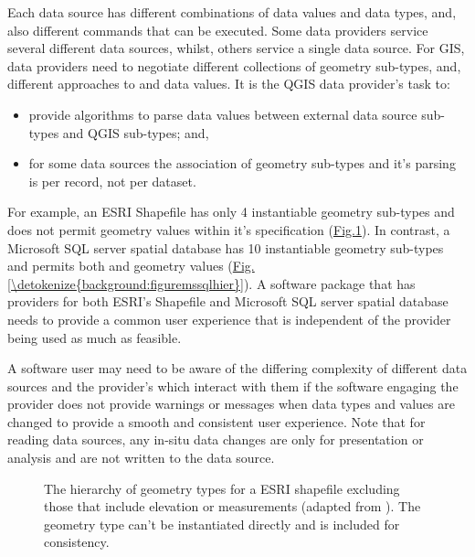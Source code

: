 \documentclass[a4paper,11pt,english]{sphinxmanual}
\begin{document}
Each data source has different combinations of data values and data types, and, also different commands that can be executed.  Some data providers service several different data sources, whilst, others service a single data source. For GIS, data providers need to negotiate different collections of geometry sub-types, and, different approaches to  and  data values.  It is the QGIS data provider’s task to:
\begin{itemize}
\item {} 
provide algorithms to parse data values between external data source sub-types and QGIS sub-types; and,

\item {} 
for some data sources the association of geometry sub-types and it’s parsing is per record, not per dataset.

\end{itemize}

For example, an ESRI Shapefile has only 4 instantiable geometry sub-types and does not permit  geometry values within it’s specification (\hyperref[\detokenize{background:figureshapehier}]{Fig.\@ \ref{\detokenize{background:figureshapehier}}}).  In contrast, a Microsoft SQL server spatial database has 10 instantiable geometry sub-types and permits both  and  geometry values (\hyperref[\detokenize{background:figuremssqlhier}]{Fig.\@ \ref{\detokenize{background:figuremssqlhier}}}).  A software package that has providers for both ESRI’s Shapefile and Microsoft SQL server spatial database needs to provide a common user experience that is independent of the provider being used as much as feasible.

A software user may need to be aware of the differing complexity of different data sources and the provider’s which interact with them if the software engaging the provider does not provide warnings or messages when data types and values are changed  to provide a smooth and consistent user experience.  Note that for reading data sources, any in-situ data changes are only for presentation or analysis and are not written to the data source.

\begin{figure}[htbp]
\centering
\capstart

\noindent{}
\caption{The hierarchy of geometry types for a ESRI shapefile excluding those that include elevation or measurements (adapted from ).  The  geometry type can’t be instantiated directly and is included for consistency.}\label{\detokenize{background:id41}}\label{\detokenize{background:figureshapehier}}\end{figure}
\end{document}
